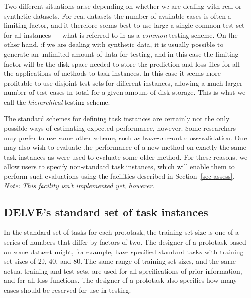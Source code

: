 Two different situations arise depending on whether we are dealing
with real or synthetic datasets. For real datasets the number of
available cases is often a limiting factor, and it therefore seems
best to use large a single common test set for all instances --- what
is referred to in \delve{} as a \emph{common} testing scheme.  On the
other hand, if we are dealing with synthetic data, it is usually
possible to generate an unlimited amount of data for testing, and in
this case the limiting factor will be the disk space needed to store
the prediction and loss files for all the applications of methods to
task instances.  In this case it seems more profitable to use disjoint
test sets for different instances, allowing a much larger number of
test cases in total for a given amount of disk storage. This is what
we call the \emph{hierarchical} testing scheme.

The standard \delve{} schemes for defining task instances are
certainly not the only possible ways of estimating expected
performance, however.  Some researchers may prefer to use some other
scheme, such as leave-one-out cross-validation.  One may also wish to
evaluate the performance of a new method on exactly the same task
instances as were used to evaluate some older method.  For these
reasons, we allow users to specify non-standard task instances, which
will enable them to perform such evaluations using the \delve{}
facilities described in Section~\ref{sec-assess}.  \emph{Note: This
facility isn't implemented yet, however.}


\subsection{DELVE's standard set of task instances}\label{scheme-standard}

In the standard set of tasks for each prototask, the training set size
is one of a series of numbers that differ by factors of two.  The
designer of a prototask based on some dataset might, for example, have
specified standard tasks with training set sizes of 20, 40, and 80.
The same range of training set sizes, and the same actual training and
test sets, are used for all specifications of prior information, and
for all loss functions.  The designer of a prototask also specifies
how many cases should be reserved for use in testing.

